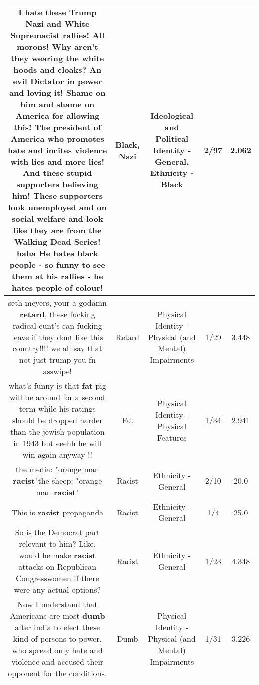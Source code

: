 \documentclass[11pt]{article}
\newlength\mylength
\begin{document}
\begin{center}
\begin{longtable}{|C{.65\mylength}|C{.30\mylength}|C{.12\mylength}|C{.12\mylength}|C{.12\mylength}|}
  \small I hate these Trump \textbf{Nazi} and White Supremacist rallies!   All morons!  Why aren't they wearing the white hoods and cloaks?  An evil Dictator in power and loving it!  Shame on him and shame on America for allowing this!  The president of America who promotes hate and incites violence with lies and more lies!  And these stupid supporters believing him!  These supporters look unemployed and on social welfare and look like they are from the Walking Dead Series!  haha  He hates \textbf{black} people - so funny to see them at his rallies - he hates people of colour!\normalsize   & Black, Nazi &  Ideological and Political Identity - General, Ethnicity - Black & 2/97 & 2.062 \\  \hline
  \small seth meyers, your a godamn \textbf{retard}, these fucking radical cunt's can fucking leave if they dont like this country!!!! we all say that not just trump you fn asswipe!\normalsize   & Retard & Physical Identity - Physical (and Mental) Impairments & 1/29 & 3.448 \\  \hline
  \small what's funny is that \textbf{fat} pig will be around for a second term while his ratings should be dropped harder than the jewish population in 1943 but eeehh he will win again anyway !!\normalsize   & Fat & Physical Identity - Physical Features & 1/34 & 2.941 \\  \hline
  \small the media: "orange man \textbf{racist}"the sheep: "orange man \textbf{racist}"\normalsize   & Racist & Ethnicity - General & 2/10 & 20.0 \\  \hline
  \small This is \textbf{racist} propaganda\normalsize   & Racist & Ethnicity - General & 1/4 & 25.0 \\  \hline
  \small So is the Democrat part relevant to him? Like, would he make \textbf{racist} attacks on Republican Congresswomen if there were any actual options?\normalsize   & Racist & Ethnicity - General & 1/23 & 4.348 \\  \hline
  \small Now I understand that Americans are most \textbf{dumb} after india to elect these kind of persons to power, who spread only hate and violence and accused their opponent for the conditions.\normalsize   & Dumb & Physical Identity - Physical (and Mental) Impairments & 1/31 & 3.226 \\  \hline

\end{longtable}
\end{center}
\end{document}
